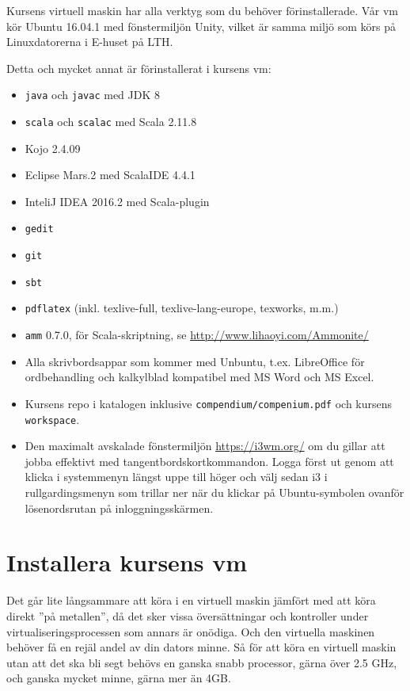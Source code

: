Kursens virtuell maskin har alla verktyg som du behöver förinstallerade.  Vår vm kör Ubuntu 16.04.1 med fönstermiljön Unity, vilket är samma miljö som körs på Linuxdatorerna i E-huset på LTH. 

Detta och mycket annat är förinstallerat i kursens vm:

\begin{itemize}
\item \texttt{java} och \texttt{javac} med JDK 8
\item \texttt{scala} och \texttt{scalac} med Scala 2.11.8
\item Kojo 2.4.09
\item Eclipse Mars.2 med ScalaIDE 4.4.1
\item InteliJ IDEA 2016.2 med Scala-plugin
\item \texttt{gedit}
\item \texttt{git}
\item \texttt{sbt}
\item \texttt{pdflatex} (inkl. texlive-full, texlive-lang-europe, texworks, m.m.) 
\item \texttt{amm} 0.7.0, för Scala-skriptning, se \url{http://www.lihaoyi.com/Ammonite/}
\item Alla skrivbordsappar som kommer med Unbuntu, t.ex. LibreOffice för ordbehandling och kalkylblad  kompatibel med MS Word och MS Excel.  
\item Kursens repo i katalogen  inklusive  \texttt{compendium/compenium.pdf} och kursens \texttt{workspace}.
\item Den maximalt avskalade fönstermiljön \url{https://i3wm.org/} om du gillar att jobba effektivt med tangentbordskortkommandon. Logga först ut genom att klicka i systemmenyn längst uppe till höger och välj sedan i3 i rullgardingsmenyn som trillar ner när du klickar på Ubuntu-symbolen ovanför lösenordsrutan på inloggningsskärmen.
\end{itemize}

\section{Installera kursens vm}

Det går lite långsammare att köra i en virtuell maskin jämfört med att köra direkt ''på metallen'', då det sker vissa översättningar och kontroller under virtualiseringsprocessen som annars är onödiga. Och den virtuella maskinen behöver få en rejäl andel av din dators minne. Så för att köra en virtuell maskin utan att det ska bli segt behövs en ganska snabb processor, gärna över 2.5 GHz, och ganska mycket minne, gärna mer än 4GB. 

